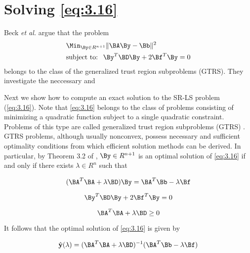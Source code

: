\startappendix{}
\label{chapter:app1}

\section{Solving \ref{eq:3.16}}

Beck \textit{et al.} \cite{BeckStLi} argue that the problem 
\begin{equation} \label{eq:A.0}
\begin{aligned}
&\Min_{{\By} \in R^{n+1}} \|\BA\By-\Bb\|^2 \\
&\mbox{subject to: \ }  \By^T\BD\By + 2\Bf^T\By = 0
\end{aligned}
\end{equation} 
belongs to the class of the generalized trust region subproblems (GTRS). They investigate the neccessary and 

Next we show how to compute an exact solution to the SR-LS problem
(\ref{eq:3.16}). Note that \ref{eq:3.16} belongs to the class of problems
consisting of minimizing a quadratic function subject to a single
quadratic constraint. Problems of this type are called generalized trust
region subproblems (GTRS) \cite{More}. GTRS problems, although usually 
nonconvex, possess necessary and sufficient optimality conditions from
which efficient solution methods can be derived. In particular, by 
Theorem 3.2 of \cite{More}, $\By \in R^{n+1}$ is an optimal solution
of \ref{eq:3.16} if and only if there exists $\lambda \in R^{n}$ 
such that

\begin{equation} \label{eq:A.1}
(\BA^{T}\BA + \lambda\BD)\By = \BA^{T}\Bb - \lambda\Bf
\end{equation}

\begin{equation} \label{eq:A.2}
\By^{T}\BD\By + 2\Bf^{T}\By = 0
\end{equation}

\begin{equation} \label{eq:A.3}
\BA^{T}\BA + \lambda\BD \geq 0
\end{equation}

It follows that the optimal solution of \ref{eq:3.16} is given by

\begin{equation} \label{eq:A.4}
\hat{\mathbf{y}}(\lambda) = (\BA^{T}\BA + \lambda\BD)^{-1}(\BA^{T}\Bb - \lambda\Bf)
\end{equation}

